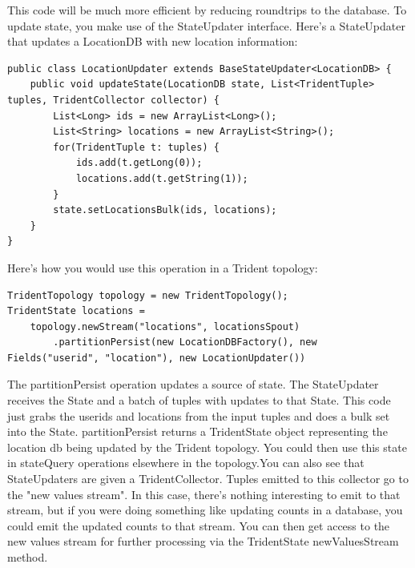 This code will be much more efficient by reducing roundtrips to the database.
To update state, you make use of the StateUpdater interface. Here's a StateUpdater that updates a LocationDB with new location information:\\[2mm]
\begin{verbatim}
public class LocationUpdater extends BaseStateUpdater<LocationDB> {
    public void updateState(LocationDB state, List<TridentTuple> tuples, TridentCollector collector) {
        List<Long> ids = new ArrayList<Long>();
        List<String> locations = new ArrayList<String>();
        for(TridentTuple t: tuples) {
            ids.add(t.getLong(0));
            locations.add(t.getString(1));
        }
        state.setLocationsBulk(ids, locations);
    }
}
\end{verbatim}
Here's how you would use this operation in a Trident topology:\\[2mm]
\begin{verbatim}
TridentTopology topology = new TridentTopology();
TridentState locations = 
    topology.newStream("locations", locationsSpout)
        .partitionPersist(new LocationDBFactory(), new Fields("userid", "location"), new LocationUpdater())
\end{verbatim}
The partitionPersist operation updates a source of state. The StateUpdater receives the State and a batch of tuples with updates to that State. This code just grabs the userids and locations from the input tuples and does a bulk set into the State. partitionPersist returns a TridentState object representing the location db being updated by the Trident topology. You could then use this state in stateQuery operations elsewhere in the topology.You can also see that StateUpdaters are given a TridentCollector. Tuples emitted to this collector go to the "new values stream". In this case, there's nothing interesting to emit to that stream, but if you were doing something like updating counts in a database, you could emit the updated counts to that stream. You can then get access to the new values stream for further processing via the TridentState newValuesStream method.
